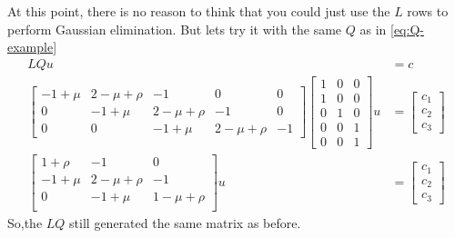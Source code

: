 \documentclass[11pt]{article}
\begin{document}
At this point, there is no reason to think that you could just use the $L$ rows to perform Gaussian elimination.  But lets try it with the same $Q$ as in \cref{eq:Q-example}
\begin{align}
L Q u &= c\\
\begin{bmatrix}
	-1 + \mu & 2 -\mu + \rho & -1 & 0 & 0\\
0 & -1 + \mu & 2 - \mu +\rho & -1 & 0\\
0 & 0 & -1 + \mu & 2 - \mu +\rho & -1
\end{bmatrix}\begin{bmatrix}
1 & 0 & 0\\
1 & 0 & 0\\
0 & 1& 0\\
0 & 0& 1\\
0 & 0& 1
\end{bmatrix} u &= \begin{bmatrix} c_1 \\ c_2 \\ c_3\end{bmatrix}\\
\begin{bmatrix}
1 + \rho & -1 & 0\\
-1 + \mu & 2 - \mu +\rho & -1\\
0 & -1 + \mu & 1 - \mu +\rho\\
\end{bmatrix} u &= \begin{bmatrix} c_1 \\ c_2 \\ c_3\end{bmatrix}
\end{align}
So,the $L Q$ still generated the same matrix as before.
\end{document}
